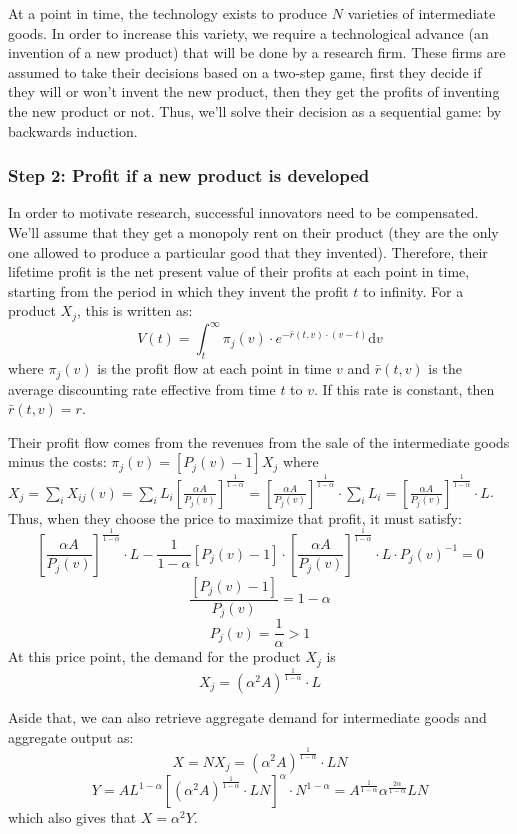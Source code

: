\documentclass[12pt]{report}
\def\D{\mathrm{d}}
\begin{document}
At a point in time, the technology exists to produce $N$ varieties of intermediate goods. In order to increase this variety, we require a technological advance (an invention of a new product) that will be done by a research firm. These firms are assumed to take their decisions based on a two-step game, first they decide if they will or won't invent the new product, then they get the profits of inventing the new product or not. Thus, we'll solve their decision as a sequential game: by backwards induction.

\subsubsection{Step 2: Profit if a new product is developed}

In order to motivate research, successful innovators need to be compensated. We'll assume that they get a monopoly rent on their product (they are the only one allowed to produce a particular good that they invented). Therefore, their lifetime profit is the net present value of their profits at each point in time, starting from the period in which they invent the profit $t$ to infinity. For a product $X_j$, this is written as: $$V(t) = \int_t^\infty \pi_j(v)\cdot e^{-\bar r(t, v)\cdot(v-t)} \D v $$ where $\pi_j(v)$ is the profit flow at each point in time $v$ and $\bar r(t, v)$ is the average discounting rate effective from time $t$ to $v$. If this rate is constant, then $\bar r(t, v) = r$.

Their profit flow comes from the revenues from the sale of the intermediate goods minus the costs: $\pi_j(v) = [P_j(v) - 1]X_j$ where $X_j = \sum_{i} X_{ij}(v) = \sum_{i} L_i \left[\frac{\alpha A}{P_j(v)}\right]^{\frac{1}{1-\alpha}} = \left[\frac{\alpha A}{P_j(v)}\right]^{\frac{1}{1-\alpha}} \cdot \sum_{i} L_i = \left[\frac{\alpha A}{P_j(v)}\right]^{\frac{1}{1-\alpha}} \cdot L$. Thus, when they choose the price to maximize that profit, it must satisfy: $$\left[\frac{\alpha A}{P_j(v)}\right]^{\frac{1}{1-\alpha}} \cdot L - \frac{1}{1-\alpha}[P_j(v) - 1]\cdot \left[\frac{\alpha A}{P_j(v)}\right]^{\frac{1}{1-\alpha}} \cdot L\cdot P_j(v)^{-1} = 0 $$ $$ \frac{[P_j(v) - 1]}{P_j(v)} = 1-\alpha $$ $$P_j(v) = \frac{1}{\alpha} > 1 $$ At this price point, the demand for the product $X_j$ is $$ X_j = (\alpha^2 A)^{\frac{1}{1-\alpha}}\cdot L $$ 

Aside that, we can also retrieve aggregate demand for intermediate goods and aggregate output as: $$X = NX_j = (\alpha^2 A)^{\frac{1}{1-\alpha}}\cdot LN $$ $$ Y = A L^{1-\alpha} [(\alpha^2 A)^{\frac{1}{1-\alpha}}\cdot LN]^{\alpha} \cdot N^{1-\alpha} = A^{\frac{1}{1-\alpha}} \alpha^{\frac{2\alpha}{1-\alpha}} LN $$ which also gives that $X = \alpha^2 Y$.
\end{document}
